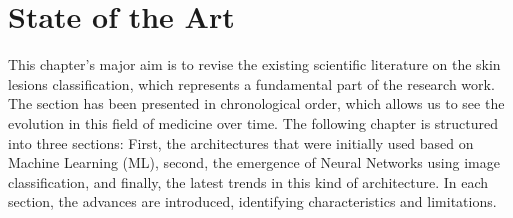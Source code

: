 \chapter{State of the Art}
\label{chapter: State of the Art}


This chapter's  major aim  is to revise the existing scientific literature on the skin lesions classification, which represents a fundamental part of the research work. The section has been presented in chronological order, which allows us to see the evolution in this field of medicine over time. The following chapter is structured into three sections: First, the architectures that were initially used based on Machine Learning (ML), second, the emergence of Neural Networks using image classification, and finally, the latest trends in this kind of architecture. In each section, the advances are introduced, identifying characteristics and limitations.

